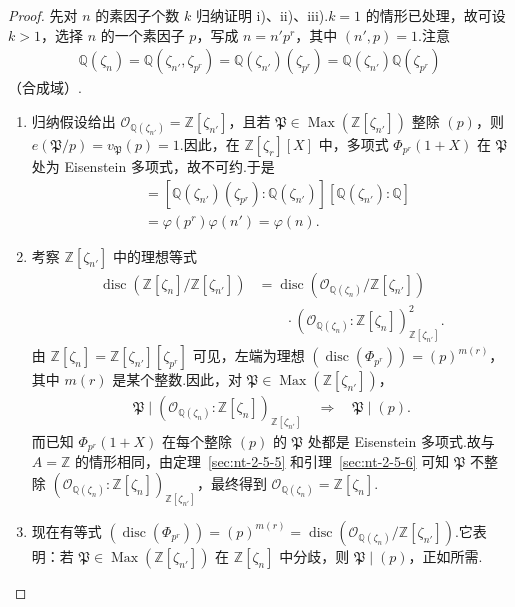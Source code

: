 \begin{proof}
先对 $n$ 的素因子个数 $k$ 归纳证明 i)、ii)、iii).$k=1$ 的情形已处理，故可设 $k>1$，选择 $n$ 的一个素因子 $p$，写成 $n=n'p^r$，其中 $(n',p)=1$.注意
\begin{align*}
\mathbb Q(\zeta_n)=\mathbb Q(\zeta_{n'},\zeta_{p^r})
=\mathbb Q(\zeta_{n'})(\zeta_{p^r})=\mathbb Q(\zeta_{n'})\mathbb Q(\zeta_{p^r})
\end{align*}
（合成域）.
\begin{enumerate}[label=\roman*)]
\item 归纳假设给出 $\mathcal O_{\mathbb Q(\zeta_{n'})}=\mathbb Z[\zeta_{n'}]$，且若 $\mathfrak P\in\operatorname{Max}(\mathbb Z[\zeta_{n'}])$ 整除 $(p)$，则 $e(\mathfrak P/p)=v_{\mathfrak P}(p)=1$.因此，在 $\mathbb Z[\zeta_r][X]$ 中，多项式 $\Phi_{p^r}(1+X)$ 在 $\mathfrak P$ 处为 Eisenstein 多项式，故不可约.于是
\begin{align*}
[\mathbb Q(\zeta_n):\mathbb Q]
&=[\mathbb Q(\zeta_{n'})(\zeta_{p^r}):\mathbb Q(\zeta_{n'})][\mathbb Q(\zeta_{n'}):\mathbb Q]\\
&=\varphi(p^r)\varphi(n')=\varphi(n).
\end{align*}
\item 考察 $\mathbb Z[\zeta_{n'}]$ 中的理想等式
\begin{align*}
\operatorname{disc}(\mathbb Z[\zeta_n]/\mathbb Z[\zeta_{n'}])
&=\operatorname{disc}(\mathcal O_{\mathbb Q(\zeta_n)}/\mathbb Z[\zeta_{n'}])\\
&\qquad\cdot(\mathcal O_{\mathbb Q(\zeta_n)}:\mathbb Z[\zeta_n])_{\mathbb Z[\zeta_{n'}]}^2.
\end{align*}
由 $\mathbb Z[\zeta_n]=\mathbb Z[\zeta_{n'}][\zeta_{p^r}]$ 可见，左端为理想 $(\operatorname{disc}(\Phi_{p^r}))=(p)^{m(r)}$，其中 $m(r)$ 是某个整数.因此，对 $\mathfrak P\in\operatorname{Max}(\mathbb Z[\zeta_{n'}])$，
\begin{align*}
\mathfrak P\mid(\mathcal O_{\mathbb Q(\zeta_n)}:\mathbb Z[\zeta_n])_{\mathbb Z[\zeta_{n'}]}
\quad\Longrightarrow\quad\mathfrak P\mid(p).
\end{align*}
而已知 $\Phi_{p^r}(1+X)$ 在每个整除 $(p)$ 的 $\mathfrak P$ 处都是 Eisenstein 多项式.故与 $A=\mathbb Z$ 的情形相同，由定理~\ref{sec:nt-2-5-5} 和引理~\ref{sec:nt-2-5-6} 可知 $\mathfrak P$ 不整除 $(\mathcal O_{\mathbb Q(\zeta_n)}:\mathbb Z[\zeta_n])_{\mathbb Z[\zeta_{n'}]}$，最终得到 $\mathcal O_{\mathbb Q(\zeta_n)}=\mathbb Z[\zeta_n]$.
\item 现在有等式 $(\operatorname{disc}(\Phi_{p^r}))=(p)^{m(r)}=\operatorname{disc}(\mathcal O_{\mathbb Q(\zeta_n)}/\mathbb Z[\zeta_{n'}])$.它表明：若 $\mathfrak P\in\operatorname{Max}(\mathbb Z[\zeta_{n'}])$ 在 $\mathbb Z[\zeta_n]$ 中分歧，则 $\mathfrak P\mid(p)$，正如所需.

\end{enumerate}
\end{proof}
